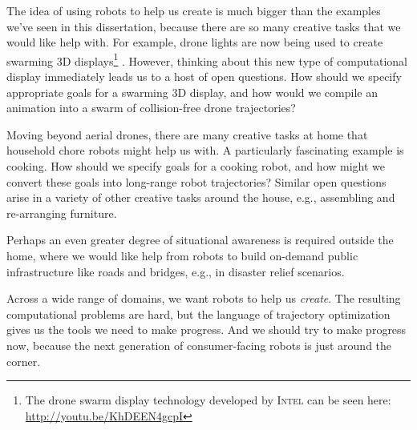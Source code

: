 The idea of using robots to help us create is much bigger than the examples we've seen in this dissertation, because there are so many creative tasks that we would like help with.
For example, drone lights are now being used to create swarming 3D displays\footnote{The drone swarm display technology developed by \textsc{Intel} can be seen here: \url{http://youtu.be/KhDEEN4gcpI}} \cite{intel:2018}.
However, thinking about this new type of computational display immediately leads us to a host of open questions.
How should we specify appropriate goals for a swarming 3D display, and how would we compile an animation into a swarm of collision-free drone trajectories?

Moving beyond aerial drones, there are many creative tasks at home that household chore robots might help us with.
A particularly fascinating example is cooking. 
How should we specify goals for a cooking robot, and how might we convert these goals into long-range robot trajectories?
Similar open questions arise in a variety of other creative tasks around the house, e.g., assembling and re-arranging furniture.

Perhaps an even greater degree of situational awareness is required outside the home, where we would like help from robots to build on-demand public infrastructure like roads and bridges, e.g., in disaster relief scenarios.

Across a wide range of domains, we want robots to help us \emph{create}.
The resulting computational problems are hard, but the language of trajectory optimization gives us the tools we need to make progress.
And we should try to make progress now, because the next generation of consumer-facing robots is just around the corner.
